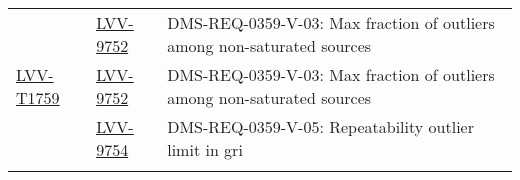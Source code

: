 \begin{longtable}{p{3cm}p{3cm}L{9cm}}
 \\ 
 &   \href{https://jira.lsstcorp.org/browse/LVV-9752}{LVV-9752}
  & DMS-REQ-0359-V-03: Max fraction of outliers among non-saturated sources
 \\ 
\hline
\href{https://jira.lsstcorp.org/secure/Tests.jspa#/testCase/LVV-T1759}{LVV-T1759} &
  \href{https://jira.lsstcorp.org/browse/LVV-9752}{LVV-9752}
  & DMS-REQ-0359-V-03: Max fraction of outliers among non-saturated sources
 \\ 
 &   \href{https://jira.lsstcorp.org/browse/LVV-9754}{LVV-9754}
  & DMS-REQ-0359-V-05: Repeatability outlier limit in gri
 \\ 
\hline
\end{longtable}
